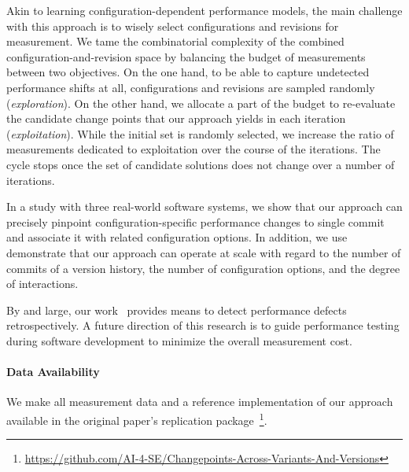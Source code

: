 \documentclass[utf8,biblatex]{lni}
\begin{document}
Akin to learning configuration-dependent performance models, the main challenge with this approach is to wisely select configurations and revisions for measurement. We tame the combinatorial complexity of the combined configuration-and-revision space by balancing the budget of measurements between two objectives. On the one hand, to be able to capture undetected performance shifts at all, configurations and revisions are sampled randomly (\textit{exploration}). On the other hand, we allocate a part of the budget to re-evaluate the candidate change points that our approach yields in each iteration (\textit{exploitation}). While the initial set is randomly selected, we increase the ratio  of measurements dedicated to exploitation over the course of the iterations. The cycle stops once the set of candidate solutions does not change over a number of iterations. 

In a study with three real-world software systems, we show that our approach can precisely pinpoint configuration-specific performance changes to single commit and associate it with related configuration options. In addition, we use demonstrate that our approach can operate at scale with regard to the number of commits of a version history, the number of configuration options, and the degree of interactions.

By and large, our work~\cite{muhlbauer_accurate_2019,muehlbauer_identifying_2020} provides means to detect performance defects retrospectively. A future direction of this research is to guide performance testing during software development to minimize the overall measurement cost.
\paragraph{Data Availability} 
We make all measurement data and a reference implementation of our approach~\cite{muehlbauer_identifying_2020} available in the original paper's replication package~\footnote{\url{https://github.com/AI-4-SE/Changepoints-Across-Variants-And-Versions}}.

\printbibliography
\end{document}
